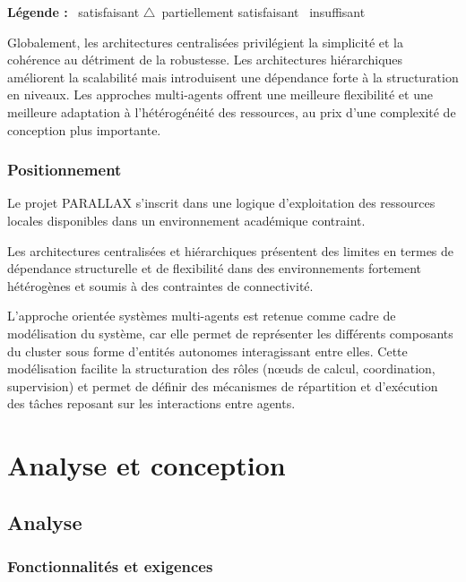 \documentclass[12pt,a4paper]{report}
\newcommand{\ccheck}{\textcolor{green!60!black}{\ding{51}}}
\newcommand{\ctri}{\textcolor{orange!80!black}{$\triangle$}}
\newcommand{\ccross}{\textcolor{red!70!black}{\ding{55}}}
\begin{document}
\textbf{Légende :}
\ccheck\ satisfaisant \quad
\ctri\ partiellement satisfaisant \quad
\ccross\ insuffisant

Globalement, les architectures centralisées privilégient la simplicité et la cohérence au détriment de la robustesse. Les architectures hiérarchiques améliorent la scalabilité mais introduisent une dépendance forte à la structuration en niveaux. Les approches multi-agents offrent une meilleure flexibilité et une meilleure adaptation à l'hétérogénéité des ressources, au prix d'une complexité de conception plus importante.

\subsection{Positionnement}

Le projet PARALLAX s'inscrit dans une logique d'exploitation des ressources locales disponibles dans un environnement académique contraint.

Les architectures centralisées et hiérarchiques présentent des limites en termes de dépendance structurelle et de flexibilité dans des environnements fortement hétérogènes et soumis à des contraintes de connectivité.

L'approche orientée systèmes multi-agents est retenue comme cadre de modélisation du système, car elle permet de représenter les différents composants du cluster sous forme d'entités autonomes interagissant entre elles. Cette modélisation facilite la structuration des rôles (nœuds de calcul, coordination, supervision) et permet de définir des mécanismes de répartition et d'exécution des tâches reposant sur les interactions entre agents.

\chapter{Analyse et conception}

\section{Analyse}

\subsection{Fonctionnalités et exigences}
\end{document}
